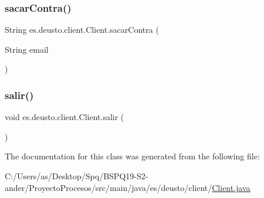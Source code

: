 \mbox{\label{classes_1_1deusto_1_1client_1_1_client_a6ce290f27e4f39f9493799cbc6112cc5}} 
\subsubsection{\texorpdfstring{sacarContra()}{sacarContra()}}
{\footnotesize\ttfamily String es.\+deusto.\+client.\+Client.\+sacar\+Contra (\begin{DoxyParamCaption}\item[{String}]{email }\end{DoxyParamCaption})}

\mbox{\label{classes_1_1deusto_1_1client_1_1_client_ac6d57dc4fbeeef9d6d60637c4e1bd1c6}} 
\subsubsection{\texorpdfstring{salir()}{salir()}}
{\footnotesize\ttfamily void es.\+deusto.\+client.\+Client.\+salir (\begin{DoxyParamCaption}{ }\end{DoxyParamCaption})}



The documentation for this class was generated from the following file\+:\begin{DoxyCompactItemize}
\item 
C\+:/\+Users/as/\+Desktop/\+Spq/\+B\+S\+P\+Q19-\/\+S2-\/ander/\+Proyecto\+Procesos/src/main/java/es/deusto/client/\mbox{\hyperlink{_client_8java}{Client.\+java}}\end{DoxyCompactItemize}

